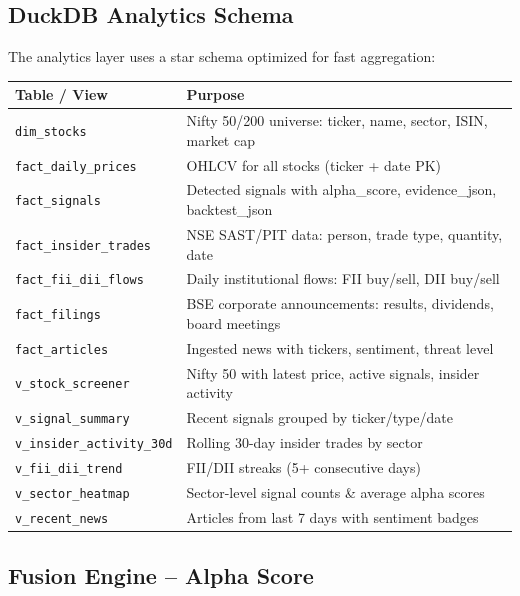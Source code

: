 \documentclass[11pt, a4paper]{article}
\begin{document}
\subsection{DuckDB Analytics Schema}

The analytics layer uses a star schema optimized for fast aggregation:

\begin{center}
\small
\begin{tabular}{L{3.8cm} L{9.5cm}}
  \toprule
  \textbf{Table / View} & \textbf{Purpose} \\
  \midrule
  \texttt{dim\_stocks} & Nifty 50/200 universe: ticker, name, sector, ISIN, market cap \\
  \texttt{fact\_daily\_prices} & OHLCV for all stocks (ticker + date PK) \\
  \texttt{fact\_signals} & Detected signals with alpha\_score, evidence\_json, backtest\_json \\
  \texttt{fact\_insider\_trades} & NSE SAST/PIT data: person, trade type, quantity, date \\
  \texttt{fact\_fii\_dii\_flows} & Daily institutional flows: FII buy/sell, DII buy/sell \\
  \texttt{fact\_filings} & BSE corporate announcements: results, dividends, board meetings \\
  \texttt{fact\_articles} & Ingested news with tickers, sentiment, threat level \\
  \midrule
  \texttt{v\_stock\_screener} & Nifty 50 with latest price, active signals, insider activity \\
  \texttt{v\_signal\_summary} & Recent signals grouped by ticker/type/date \\
  \texttt{v\_insider\_activity\_30d} & Rolling 30-day insider trades by sector \\
  \texttt{v\_fii\_dii\_trend} & FII/DII streaks (5+ consecutive days) \\
  \texttt{v\_sector\_heatmap} & Sector-level signal counts \& average alpha scores \\
  \texttt{v\_recent\_news} & Articles from last 7 days with sentiment badges \\
  \bottomrule
\end{tabular}
\end{center}

\subsection{Fusion Engine -- Alpha Score}
\end{document}
